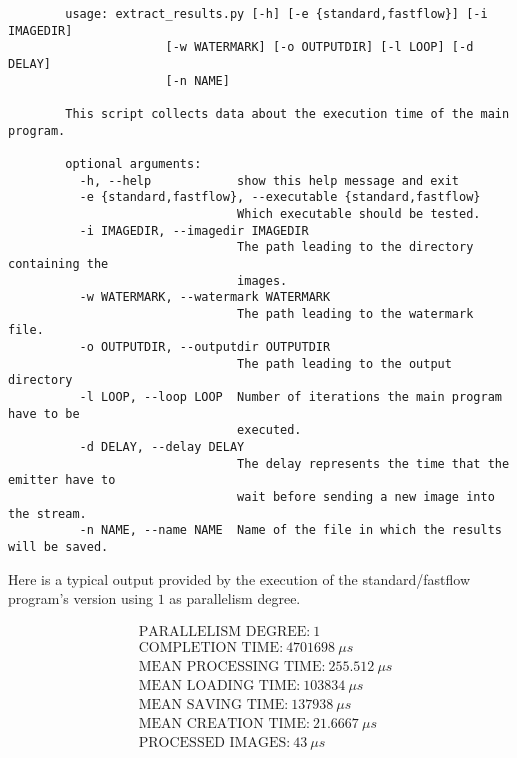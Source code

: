     \begin{verbatim}
        usage: extract_results.py [-h] [-e {standard,fastflow}] [-i IMAGEDIR]
                      [-w WATERMARK] [-o OUTPUTDIR] [-l LOOP] [-d DELAY]
                      [-n NAME]

        This script collects data about the execution time of the main program.

        optional arguments:
          -h, --help            show this help message and exit
          -e {standard,fastflow}, --executable {standard,fastflow}
                                Which executable should be tested.
          -i IMAGEDIR, --imagedir IMAGEDIR
                                The path leading to the directory containing the
                                images.
          -w WATERMARK, --watermark WATERMARK
                                The path leading to the watermark file.
          -o OUTPUTDIR, --outputdir OUTPUTDIR
                                The path leading to the output directory
          -l LOOP, --loop LOOP  Number of iterations the main program have to be
                                executed.
          -d DELAY, --delay DELAY
                                The delay represents the time that the emitter have to
                                wait before sending a new image into the stream.
          -n NAME, --name NAME  Name of the file in which the results will be saved.
    \end{verbatim}

    Here is a typical output provided by the execution of the standard/fastflow program's version using $1$ as
    parallelism degree.

    \begin{align*}
        &\text{PARALLELISM DEGREE:} \ 1 \\
        &\text{COMPLETION TIME:} \ 4701698 \ \mu s \\
        &\text{MEAN PROCESSING TIME:} \ 255.512 \ \mu s \\
        &\text{MEAN LOADING TIME:} \ 103834 \ \mu s \\
        &\text{MEAN SAVING TIME:} \ 137938 \ \mu s \\
        &\text{MEAN CREATION TIME:} \ 21.6667 \ \mu s \\
        &\text{PROCESSED IMAGES:} \ 43 \ \mu s \\
    \end{align*}
